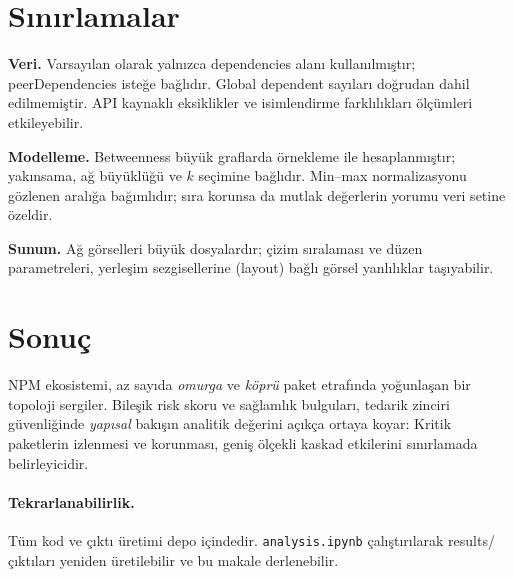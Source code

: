 \documentclass[11pt,a4paper]{article}
\begin{document}
\section{Sınırlamalar}
\textbf{Veri.} Varsayılan olarak yalnızca dependencies alanı kullanılmıştır; peerDependencies isteğe bağlıdır. Global dependent sayıları doğrudan dahil edilmemiştir. API kaynaklı eksiklikler ve isimlendirme farklılıkları ölçümleri etkileyebilir.

\textbf{Modelleme.} Betweenness büyük graflarda örnekleme ile hesaplanmıştır; yakınsama, ağ büyüklüğü ve $k$ seçimine bağlıdır. Min--max normalizasyonu gözlenen aralığa bağımlıdır; sıra korunsa da mutlak değerlerin yorumu veri setine özeldir.

\textbf{Sunum.} Ağ görselleri büyük dosyalardır; çizim sıralaması ve düzen parametreleri, yerleşim sezgisellerine (layout) bağlı görsel yanlılıklar taşıyabilir.

\section{Sonuç}
NPM ekosistemi, az sayıda \emph{omurga} ve \emph{köprü} paket etrafında yoğunlaşan bir topoloji sergiler. Bileşik risk skoru ve sağlamlık bulguları, tedarik zinciri güvenliğinde \emph{yapısal} bakışın analitik değerini açıkça ortaya koyar: Kritik paketlerin izlenmesi ve korunması, geniş ölçekli kaskad etkilerini sınırlamada belirleyicidir.

\paragraph{Tekrarlanabilirlik.} Tüm kod ve çıktı üretimi depo içindedir. \texttt{analysis.ipynb} çalıştırılarak results/ çıktıları yeniden üretilebilir ve bu makale derlenebilir.
\end{document}
